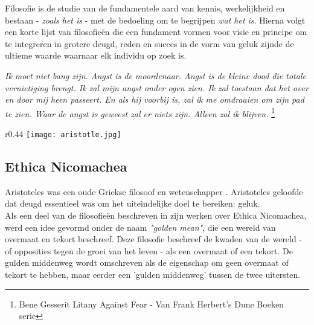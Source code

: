 \documentclass[11pt]{article}
\begin{document}
Filosofie is de studie van de fundamentele aard van kennis, werkelijkheid en bestaan - \textit{zoals het is} - met de bedoeling om te begrijpen \textit{wat het is}. 
Hierna volgt een korte lijst van filosofie\"en die een fundament vormen voor visie en principe om te integreren in grotere deugd, reden en succes in de vorm van geluk zijnde de ultieme waarde waarnaar elk individu op zoek is.

\begin{center}
\textit{
Ik moet niet bang zijn.\linebreak
Angst is de moordenaar.\linebreak
Angst is de kleine dood die totale vernietiging brengt.\linebreak
Ik zal mijn angst onder ogen zien.\linebreak
Ik zal toestaan ​​dat het over en door mij heen passeert.\linebreak
En als hij voorbij is, zal ik me omdraaien om zijn pad te zien.\linebreak
Waar de angst is geweest zal er niets zijn. \linebreak
Alleen zal ik blijven.\linebreak
}
\footnote{Bene Gesserit Litany Against Fear - Van Frank Herbert’s Dune Boeken serie}
\end{center}

\begin{wrapfigure}[17]{r}{0.44\textwidth}
    \centering
    \texttt{[image: aristotle.jpg]}
\end{wrapfigure}

\subsection{Ethica Nicomachea}

Aristoteles was een oude Griekse filosoof en wetenschapper \cite{aristotle}. 
Aristoteles geloofde dat deugd essentieel was om het uiteindelijke doel te bereiken: geluk.\\ 
\noindent Als een deel van de filosofie\"en beschreven in zijn werken over Ethica Nicomachea, werd een idee gevormd onder de naam \textit{"golden mean"}, die een wereld van overmaat en tekort beschreef. Deze filosofie beschreef de kwaden van de wereld - of opposities tegen de groei van het leven - als een overmaat of een tekort. De gulden middenweg wordt omschreven als de eigenschap om geen overmaat of tekort te hebben, maar eerder een 'gulden middenweg' tussen de twee uitersten.
\end{document}
